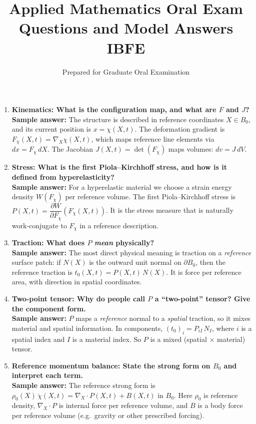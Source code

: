 \documentclass[12pt]{article}
\title{\vspace{-2em}\textbf{Applied Mathematics Oral Exam Questions and Model Answers}\\
\large IBFE}
\author{Prepared for Graduate Oral Examination}
\date{}
\begin{document}
\maketitle

\begin{enumerate}

\item \textbf{Kinematics: What is the configuration map, and what are $F$ and $J$?}\\
\textbf{Sample answer:} The structure is described in reference coordinates $X\in B_0$, and its current position is
$x=\chi(X,t)$. The deformation gradient is $F_\chi(X,t)=\nabla_X \chi(X,t)$, which maps reference line elements via
$d x = F_\chi\, dX$. The Jacobian $J(X,t)=\det(F_\chi)$ maps volumes: $dv = J\, dV$.

\item \textbf{Stress: What is the first Piola--Kirchhoff stress, and how is it defined from hyperelasticity?}\\
\textbf{Sample answer:} For a hyperelastic material we choose a strain energy density $W(F_\chi)$ per reference volume.
The first Piola--Kirchhoff stress is $P(X,t) = \dfrac{\partial W}{\partial F_\chi}(F_\chi(X,t))$. It is the stress measure
that is naturally work-conjugate to $F_\chi$ in a reference description.

\item \textbf{Traction: What does $P$ \emph{mean} physically?}\\
\textbf{Sample answer:} The most direct physical meaning is traction on a \emph{reference} surface patch:
if $N(X)$ is the outward unit normal on $\partial B_0$, then the reference traction is
$t_0(X,t)=P(X,t)\,N(X)$. It is force per reference area, with direction in spatial coordinates.

\item \textbf{Two-point tensor: Why do people call $P$ a ``two-point'' tensor? Give the component form.}\\
\textbf{Sample answer:} $P$ maps a \emph{reference} normal to a \emph{spatial} traction, so it mixes material and spatial
information. In components, $(t_0)_i = P_{iI}\,N_I$, where $i$ is a spatial index and $I$ is a material index. So $P$ is
a mixed (spatial $\times$ material) tensor.

\item \textbf{Reference momentum balance: State the strong form on $B_0$ and interpret each term.}\\
\textbf{Sample answer:} The reference strong form is
$\rho_0(X)\,\ddot{\chi}(X,t)=\nabla_X\cdot P(X,t) + B(X,t)$ in $B_0$.
Here $\rho_0$ is reference density, $\nabla_X\cdot P$ is internal force per reference volume, and $B$ is a body force per
reference volume (e.g.\ gravity or other prescribed forcing).


\end{enumerate}
\end{document}
